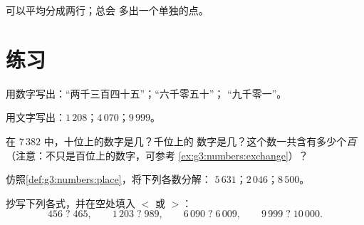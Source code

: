 \begin{omfigure}

{\small {}可以平均分成两行；总会
多出一个单独的点。}
\end{omfigure}

\section{练习}

\begin{exercise}[$\star$]\label{exo:g3:numbers:1}
用数字写出：“两千三百四十五”；“六千零五十”；
“九千零一”。
\end{exercise}

\begin{exercise}[$\star$]\label{exo:g3:numbers:2}
用文字写出：$1\,208$；\quad $4\,070$；\quad $9\,999$。
\end{exercise}

\begin{exercise}[$\star$]\label{exo:g3:numbers:3}
在 $7\,382$ 中，十位上的数字是几？千位上的
数字是几？这个数一共含有多少个\emph{百}
（注意：不只是百位上的数字，可参考
\cref{ex:g3:numbers:exchange}）？
\end{exercise}

\begin{exercise}[$\star$]\label{exo:g3:numbers:4}
仿照\cref{def:g3:numbers:place}，将下列各数分解：
$5\,631$；\quad $2\,046$；\quad $8\,500$。
\end{exercise}

\begin{exercise}[$\star$]\label{exo:g3:numbers:5}
抄写下列各式，并在空处填入 $<$ 或 $>$：
\[
456 \;?\; 465, \qquad
1\,203 \;?\; 989, \qquad
6\,090 \;?\; 6\,009, \qquad
9\,999 \;?\; 10\,000 .
\]
\end{exercise}

